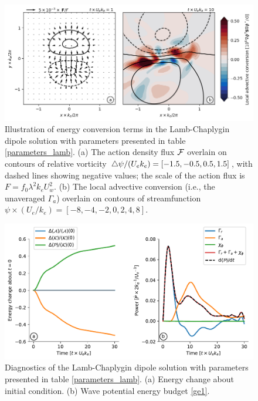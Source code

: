 \documentclass{jfm}
\begin{document}
 \begin{figure}
 \label{illustration_conversion}
 \centering
 \includegraphics[width=.92\textwidth]{figs/ConversionIllustration.png}
 \caption{Illustration of energy conversion terms in the Lamb-Chaplygin dipole solution
           with parameters presented
           in table \ref{parameters_lamb}. (a) The action density flux $\mathcal{F}$
           overlain on contours of relative vorticity $\triangle\psi / (U_e k_e)
           = [-1.5,-0.5,0.5,1.5]$, with dashed lines showing negative values;
           the scale of the action flux is $F = f_0\lambda^2 k_e U_w^2$. (b) The
           local advective conversion
           (i.e., the unaveraged $\Gamma_a$) overlain on contours of streamfunction
           $\psi \times (U_e/k_e)= [-8,-4,-2,0,2,4,8]$.}
 \end{figure}

\begin{figure}
\label{stats_lamb}
\centering
\includegraphics[width=1.\textwidth]{figs/fig2.pdf}
\caption{Diagnostics of the Lamb-Chaplygin dipole solution with parameters presented
          in table \ref{parameters_lamb}. (a) Energy change about initial condition.
        (b) Wave potential energy budget \eqref{ge1}.
        }
\end{figure}
\end{document}
